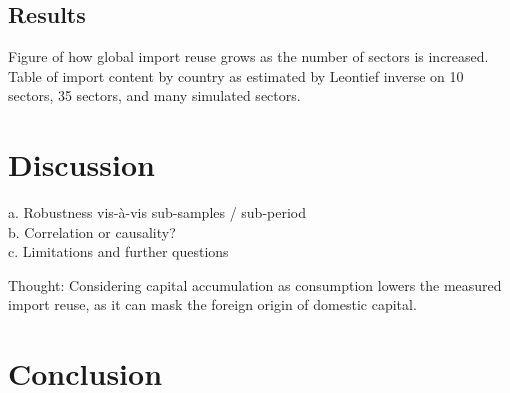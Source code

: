 \documentclass[english]{uzhpub}
\begin{document}
\subsection{Results}
Figure of how global import reuse grows as the number of sectors is increased.\\
Table of import content by country as estimated by Leontief inverse on 10 sectors, 35 sectors, and many simulated sectors.\\


\section{Discussion}
a.	Robustness vis-à-vis sub-samples / sub-period\\
b.	Correlation or causality?\\
c.	Limitations and further questions

Thought: Considering capital accumulation as consumption lowers the measured import reuse, as it can mask the foreign origin of domestic capital.

\section{Conclusion}
\end{document}
